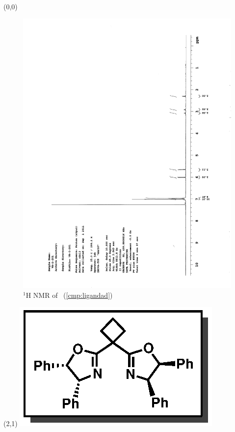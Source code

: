 \begin{textblock}{20}(0,0)
\begin{figure}[htb]
\caption{$^1$H NMR of \CMPligandad\ (\ref{cmp:ligandad})}
\includegraphics[scale=0.75, trim = 0mm 0mm 0mm 5mm,
clip]{chp_asymmetric/images/nmr/ligandadH}
\vspace{-100pt}
\end{figure}
\end{textblock}
\begin{textblock}{1}(2,1)
\includegraphics[scale=0.8, angle=90]{chp_asymmetric/images/ligandad}
\end{textblock}
